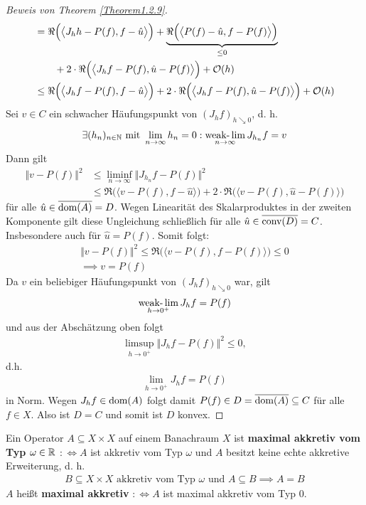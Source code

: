 \begin{proof}[Beweis von Theorem \ref{Theorem1.2.9}]
\begin{align*}
&=\Re\Big(\big\langle J_h h-P(f),f-\hat{u}\big\rangle\Big)
+\underbrace{\Re\Big(\big\langle P(f)-\hat{u},f-P(f)\big\rangle\Big)}_{\leq0}\\
&\qquad+2\cdot\Re\Big(\big\langle J_h f-P(f),\hat{u}-P(f)\big\rangle\Big)+\mathcal{O}(h)\\
&\leq
\Re\Big(\big\langle J_h f-P(f),f-\hat{u}\big\rangle\Big)
+2\cdot\Re\Big(\big\langle J_h f-P(f),\hat{u}-P(f)\big\rangle\Big)+\mathcal{O}(h)
\end{align*}
Sei $v\in C$ ein schwacher Häufungspunkt von $(J_h f)_{h\searrow 0}$, d. h.
\begin{align*}
\exists (h_n)_{n\in\mathbb{N}}\text{ mit } \lim\limits_{n\to\infty} h_n=0:\operatorname*{\text{weak-}\lim}\limits_{n\to\infty} J_{h_n} f=v
\end{align*}
Dann gilt
\begin{align*}
\Vert v-P(f)\Vert^2 
&\leq\liminf\limits_{n\to\infty}\big\Vert J_{h_n} f-P(f)\big\Vert^2\\
&\leq
\Re\Big(\big\langle v-P(f),f-\hat{u}\big\rangle\Big)
+2\cdot\Re\Big(\big\langle v-P(f),\hat{u}-P(f)\big\rangle\Big)
\end{align*}
für alle $\hat{u}\in\overline{\text{dom}(A)}=D$.
Wegen Linearität des Skalarproduktes in der zweiten Komponente gilt diese Ungleichung schließlich für alle $\hat{u}\in\overline{\text{conv}(D)}=C$. Insbesondere auch für $\hat{u}=P(f)$. Somit folgt:
\begin{align*}
\big\Vert v-P(f)\big\Vert^2
\leq
\Re\Big(\big\langle v-P(f),f-P(f)\big\rangle\Big)
\leq0\\
\implies
v=P(f)
\end{align*}
Da $v$ ein beliebiger Häufungspunkt von $(J_h f)_{h\searrow 0}$ war, gilt 
\begin{align*}
\operatorname*{\text{weak-}\lim}\limits_{h\to0^+} J_h f=P(f)
\end{align*}
und aus der Abschätzung oben folgt 
\begin{align*}
\limsup\limits_{h\to 0^+}\big\Vert J_h f-P(f)\big\Vert^2
\leq
0,
\end{align*}
d.h. 
\begin{align*}
\lim\limits_{h\to 0^+} J_h f=P(f)
\end{align*}
in Norm. Wegen $J_h f\in\text{dom}(A)$ folgt damit $P(f)\in D=\overline{\text{dom}(A)}\subseteq C$ für alle $f\in X$. Also ist $D=C$ und somit ist $D$ konvex.
\end{proof}

\begin{definition}
Ein Operator $A\subseteq X\times X$ auf einem Banachraum $X$ ist \textbf{maximal akkretiv vom Typ $\omega\in\mathbb{R}$} $:\Longleftrightarrow A$ ist akkretiv vom Typ $\omega$ und $A$ besitzt keine echte akkretive Erweiterung, d. h.
\begin{align*}
B\subseteq X\times X\text{ akkretiv vom Typ $\omega$ und }A\subseteq B
\implies A=B
\end{align*}
$A$ heißt \textbf{maximal akkretiv} $:\Longleftrightarrow A$ ist maximal akkretiv vom Typ 0.
\end{definition}


